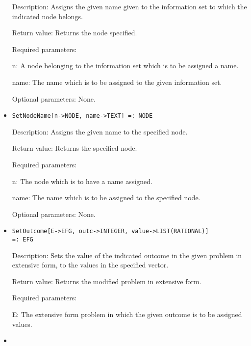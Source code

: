 \begin{itemize}
\bd
\item
[Description:] Assigns the given name given to the information set to 
which the indicated node belongs.
\item
[Return value:] Returns the node specified.
\item
[Required parameters:]\hfil\null
	
\bd
\item
[ n:] A node belonging to the information set which is to be 
assigned a name.
\item
[ name:] The name which is to be assigned to the given information set.
\ed

\item
[Optional parameters:] None.
\ed

\item

\protect \large \begin{verbatim}
SetNodeName[n->NODE, name->TEXT] =: NODE
\end{verbatim}\normalsize

\bd
\item
[Description:] Assigns the given name to the specified node.
\item
[Return value:] Returns the specified node.
\item
[Required parameters:]\hfil\null
	
\bd
\item
[ n:] The node which is to have a name assigned.
\item
[ name:] The name which is to be assigned to the specified node.
\ed

\item
[Optional parameters:] None.
\ed

\item
\protect \large \begin{verbatim}
SetOutcome[E->EFG, outc->INTEGER, value->LIST(RATIONAL)] 
=: EFG
\end{verbatim}\normalsize
   
\bd
\item
[Description:] Sets the value of the indicated outcome in the given 
problem in extensive form, to the values in the specified vector.
\item
[Return value:] Returns the modified problem in extensive form. 
\item
[Required parameters:]\hfil\null
	
\bd
\item
[ E:] The extensive form problem in which the given outcome is to be
assigned values.
\item


\end{itemize}
